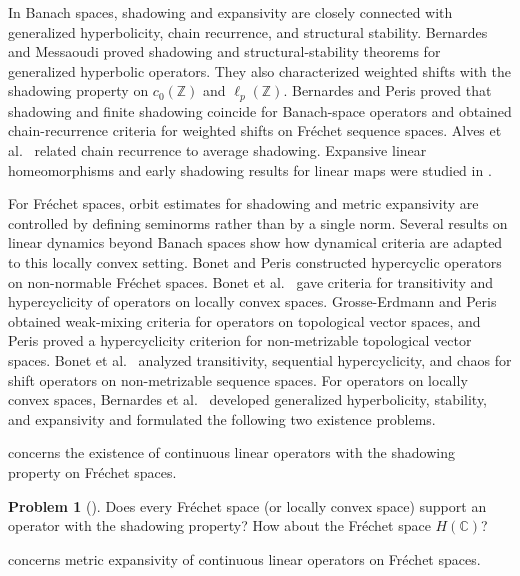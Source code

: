 \documentclass[11pt]{amsart}
\theoremstyle{definition}
\newtheorem{problem}{Problem}
\theoremstyle{remark}
\theoremstyle{plain}
\begin{document}
In Banach spaces, shadowing and expansivity are closely connected with
generalized hyperbolicity, chain recurrence, and structural stability.
Bernardes and Messaoudi \cite{BernardesMessaoudi} proved shadowing and
structural-stability theorems for generalized hyperbolic operators.  They also
characterized weighted shifts with the shadowing property on
\(c_0(\mathbb Z)\) and \(\ell_p(\mathbb Z)\).  Bernardes and Peris
\cite{BernardesPeris} proved that shadowing and finite shadowing coincide for
Banach-space operators and obtained chain-recurrence criteria for weighted
shifts on Fr\'echet sequence spaces.  Alves et
al.~\cite{AlvesBernardesMessaoudi} related chain recurrence to average
shadowing.  Expansive linear homeomorphisms and early shadowing results for
linear maps were studied in
\cite{Eisenberg,EisenbergHedlund,Hedlund,Ombach,Mazur}.

For Fr\'echet spaces, orbit estimates for shadowing and metric expansivity are
controlled by defining seminorms rather than by a single norm.  Several results
on linear dynamics beyond Banach spaces show how dynamical criteria are
adapted to this locally convex setting.  Bonet and Peris \cite{BonetPeris}
constructed hypercyclic operators on non-normable Fr\'echet spaces.  Bonet et
al.~\cite{BonetFrerickPerisWengenroth} gave criteria for transitivity and
hypercyclicity of operators on locally convex spaces.  Grosse-Erdmann and
Peris \cite{GrosseErdmannPerisWeaklyMixing} obtained weak-mixing criteria for
operators on topological vector spaces, and Peris
\cite{PerisHypercyclicityCriterion} proved a hypercyclicity criterion for
non-metrizable topological vector spaces.  Bonet et
al.~\cite{BonetKalmesPeris} analyzed transitivity, sequential hypercyclicity,
and chaos for shift operators on non-metrizable sequence spaces.  For
operators on locally convex spaces, Bernardes et al.~\cite{BCDFP} developed
generalized hyperbolicity, stability, and expansivity and formulated the
following two existence problems.

\cite[Problem A]{BCDFP} concerns the existence of continuous linear operators with
the shadowing property on Fr\'echet spaces.

\begin{problem}[{\cite[Problem A]{BCDFP}}]\label{problem:A}
Does every Fr\'echet space (or locally convex space) support an
operator with the shadowing property?  How about the Fr\'echet
space \(H(\mathbb{C})\)?
\end{problem}

\cite[Problem B]{BCDFP} concerns metric expansivity of continuous linear operators
on Fr\'echet spaces.
\end{document}
